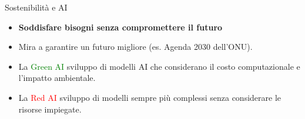 \begin{frame}{Sostenibilità e AI} 
        \begin{itemize}
                \item \textbf{Soddisfare bisogni senza compromettere il futuro}
                \item Mira a garantire un futuro migliore (es. Agenda 2030 dell'ONU).
                \item La \textcolor{green}{Green AI} sviluppo di modelli AI che considerano il costo computazionale e l'impatto ambientale.
                \item La \textcolor{red}{Red AI} sviluppo di modelli sempre più complessi senza considerare le risorse impiegate.
        \end{itemize}
\end{frame}
